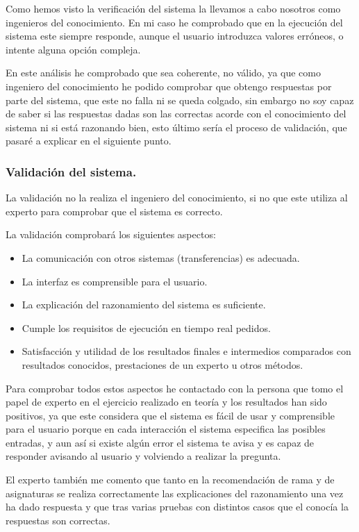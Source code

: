 \documentclass[12pt, spanish]{article}
\begin{document}
Como hemos visto la verificación del sistema la llevamos a cabo nosotros como ingenieros del conocimiento. En mi caso he comprobado que en la ejecución del sistema este siempre responde, aunque el usuario introduzca valores erróneos, o intente alguna opción compleja. 

En este análisis he comprobado que sea coherente, no válido, ya que como ingeniero del conocimiento he podido comprobar que obtengo respuestas por parte del sistema, que este no falla ni se queda colgado, sin embargo no soy capaz de saber si las respuestas dadas son las correctas acorde con el conocimiento del sistema ni si está razonando bien, esto último sería el proceso de validación, que pasaré a explicar en el siguiente punto.

\subsubsection{Validación del sistema.}

La validación no la realiza el ingeniero del conocimiento, si no que este utiliza al experto para comprobar que el sistema es correcto.

La validación comprobará los siguientes aspectos:

\begin{itemize}
	\item La comunicación con otros sistemas (transferencias) es adecuada.
	\item La interfaz es comprensible para el usuario.
	\item La explicación del razonamiento del sistema es suficiente.
	\item Cumple los requisitos de ejecución en tiempo real pedidos.
	\item Satisfacción y utilidad de los resultados finales e intermedios comparados con resultados conocidos, prestaciones de un experto u otros métodos.
\end{itemize}


Para comprobar todos estos aspectos he contactado con la persona que tomo el papel de experto en el ejercicio realizado en teoría y los resultados han sido positivos, ya que este considera que el sistema es fácil de usar y comprensible para el usuario porque en cada interacción el sistema especifica las posibles entradas, y aun así si existe algún error el sistema te avisa y es capaz de responder avisando al usuario y volviendo a realizar la pregunta.

El experto también me comento que tanto en la recomendación de rama y de asignaturas se realiza correctamente las explicaciones del razonamiento una vez ha dado respuesta y que tras varias pruebas con distintos casos que el conocía la respuestas son correctas.
\end{document}
